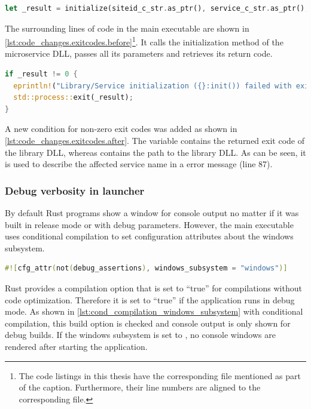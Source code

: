 \begin{lstlisting}[label=lst:code_changes.exitcodes.before, caption={Former code snippet from main executable for calling the microservice library code in Rust (\textit{/Microservices/OpenTwin/src/main.rs})}, language=rust, firstnumber=85]
let _result = initialize(siteid_c_str.as_ptr(), service_c_str.as_ptr(), db_c_str.as_ptr(), dir_c_str.as_ptr());
\end{lstlisting}
The surrounding lines of code in the main executable are shown in \autoref{lst:code_changes.exitcodes.before}\footnote{The code listings in this thesis have the corresponding file mentioned as part of the caption. Furthermore, their line numbers are aligned to the corresponding file.}. It calls the initialization method of the microservice \ac{DLL}, passes all its parameters and retrieves its return code.

\begin{lstlisting}[label=lst:code_changes.exitcodes.after, caption={Code changes in Rust main executable for additional treatment of exit codes (\textit{/Microservices/OpenTwin/src/main.rs})}, language=rust, firstnumber=86]
if _result != 0 {
  eprintln!("Library/Service initialization ({}:init()) failed with exit code {}", lib_path, _result);
  std::process::exit(_result);
}
\end{lstlisting}
A new condition for non-zero exit codes was added as shown in \autoref{lst:code_changes.exitcodes.after}. The variable   contains the returned exit code of the library \ac{DLL}, whereas  contains the path to the library \ac{DLL}. As can be seen, it is used to describe the affected service name in a error message (line 87).
 
\subsubsection*{Debug verbosity in launcher}
By default Rust programs show a window for console output no matter if it was built in release mode or with debug parameters. However, the main executable uses conditional compilation to set configuration attributes about the windows subsystem.
\begin{lstlisting}[label=lst:cond_compilation_windows_subsystem, caption={Conditional compilation for disabling console output in non-debug builds (\textit{/Microservices/OpenTwin/src/main.rs})}, language=rust, firstnumber=2]
#![cfg_attr(not(debug_assertions), windows_subsystem = "windows")]
\end{lstlisting}
Rust provides a compilation option  that is set to \enquote{true} for compilations without code optimization\cite{Rust.20230209}. Therefore it is set to \enquote{true} if the application runs in debug mode. As shown in \autoref{lst:cond_compilation_windows_subsystem} with conditional compilation, this build option is checked and console output is only shown for debug builds. If the windows subsystem is set to , no console windows are rendered after starting the application.

